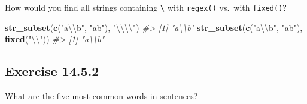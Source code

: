 \documentclass[]{book}
\newenvironment{Shaded}{\begin{snugshade}}{\end{snugshade}}
\newcommand{\CharTok}[1]{\textcolor[rgb]{0.31,0.60,0.02}{#1}}
\newcommand{\CommentTok}[1]{\textcolor[rgb]{0.56,0.35,0.01}{\textit{#1}}}
\newcommand{\DataTypeTok}[1]{\textcolor[rgb]{0.13,0.29,0.53}{#1}}
\newcommand{\DecValTok}[1]{\textcolor[rgb]{0.00,0.00,0.81}{#1}}
\newcommand{\KeywordTok}[1]{\textcolor[rgb]{0.13,0.29,0.53}{\textbf{#1}}}
\newcommand{\NormalTok}[1]{#1}
\newcommand{\OperatorTok}[1]{\textcolor[rgb]{0.81,0.36,0.00}{\textbf{#1}}}
\newcommand{\OtherTok}[1]{\textcolor[rgb]{0.56,0.35,0.01}{#1}}
\newcommand{\StringTok}[1]{\textcolor[rgb]{0.31,0.60,0.02}{#1}}
\theoremstyle{plain}
\theoremstyle{remark}
\begin{document}
How would you find all strings containing \texttt{\textbackslash{}} with
\texttt{regex()} vs.~with \texttt{fixed()}?

\begin{Shaded}
\begin{Highlighting}[]
\KeywordTok{str_subset}\NormalTok{(}\KeywordTok{c}\NormalTok{(}\StringTok{"a}\CharTok{\textbackslash{}\textbackslash{}}\StringTok{b"}\NormalTok{, }\StringTok{"ab"}\NormalTok{), }\StringTok{"}\CharTok{\textbackslash{}\textbackslash{}\textbackslash{}\textbackslash{}}\StringTok{"}\NormalTok{)}
\CommentTok{#> [1] "a\textbackslash{}\textbackslash{}b"}
\KeywordTok{str_subset}\NormalTok{(}\KeywordTok{c}\NormalTok{(}\StringTok{"a}\CharTok{\textbackslash{}\textbackslash{}}\StringTok{b"}\NormalTok{, }\StringTok{"ab"}\NormalTok{), }\KeywordTok{fixed}\NormalTok{(}\StringTok{"}\CharTok{\textbackslash{}\textbackslash{}}\StringTok{"}\NormalTok{))}
\CommentTok{#> [1] "a\textbackslash{}\textbackslash{}b"}
\end{Highlighting}
\end{Shaded}

\hypertarget{exercise-14.5.2}{%
\subsection*{\texorpdfstring{Exercise
{14.5.2}}{Exercise 14.5.2}}\label{exercise-14.5.2}}

What are the five most common words in sentences?

\begin{Shaded}
\end{Shaded}
\end{document}
